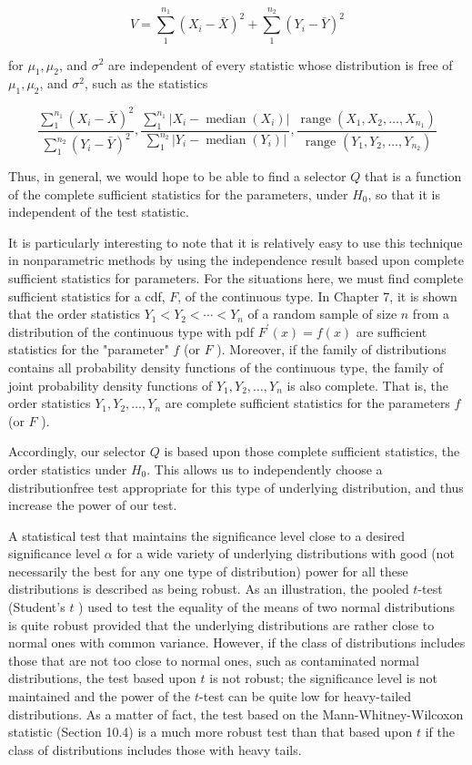 $$
V=\sum_{1}^{n_{1}}\left(X_{i}-\bar{X}\right)^{2}+\sum_{1}^{n_{2}}\left(Y_{i}-\bar{Y}\right)^{2}
$$

for $\mu_{1}, \mu_{2}$, and $\sigma^{2}$ are independent of every statistic whose distribution is free of\\
$\mu_{1}, \mu_{2}$, and $\sigma^{2}$, such as the statistics

$$
\frac{\sum_{1}^{n_{1}}\left(X_{i}-\bar{X}\right)^{2}}{\sum_{1}^{n_{2}}\left(Y_{i}-\bar{Y}\right)^{2}}, \frac{\sum_{1}^{n_{1}}\left|X_{i}-\operatorname{median}\left(X_{i}\right)\right|}{\sum_{1}^{n_{2}}\left|Y_{i}-\operatorname{median}\left(Y_{i}\right)\right|}, \frac{\operatorname{range}\left(X_{1}, X_{2}, \ldots, X_{n_{1}}\right)}{\text { range }\left(Y_{1}, Y_{2}, \ldots, Y_{n_{2}}\right)}
$$

Thus, in general, we would hope to be able to find a selector $Q$ that is a function of the complete sufficient statistics for the parameters, under $H_{0}$, so that it is independent of the test statistic.

It is particularly interesting to note that it is relatively easy to use this technique in nonparametric methods by using the independence result based upon complete sufficient statistics for parameters. For the situations here, we must find complete sufficient statistics for a cdf, $F$, of the continuous type. In Chapter 7, it is shown that the order statistics $Y_{1}<Y_{2}<\cdots<Y_{n}$ of a random sample of size $n$ from a distribution of the continuous type with pdf $F^{\prime}(x)=f(x)$ are sufficient statistics for the "parameter" $f$ (or $F$ ). Moreover, if the family of distributions contains all probability density functions of the continuous type, the family of joint probability density functions of $Y_{1}, Y_{2}, \ldots, Y_{n}$ is also complete. That is, the order statistics $Y_{1}, Y_{2}, \ldots, Y_{n}$ are complete sufficient statistics for the parameters $f$ (or $F$ ).

Accordingly, our selector $Q$ is based upon those complete sufficient statistics, the order statistics under $H_{0}$. This allows us to independently choose a distributionfree test appropriate for this type of underlying distribution, and thus increase the power of our test.

A statistical test that maintains the significance level close to a desired significance level $\alpha$ for a wide variety of underlying distributions with good (not necessarily the best for any one type of distribution) power for all these distributions is described as being robust. As an illustration, the pooled $t$-test (Student's $t$ ) used to test the equality of the means of two normal distributions is quite robust provided that the underlying distributions are rather close to normal ones with common variance. However, if the class of distributions includes those that are not too close to normal ones, such as contaminated normal distributions, the test based upon $t$ is not robust; the significance level is not maintained and the power of the $t$-test can be quite low for heavy-tailed distributions. As a matter of fact, the test based on the Mann-Whitney-Wilcoxon statistic (Section 10.4) is a much more robust test than that based upon $t$ if the class of distributions includes those with heavy tails.

